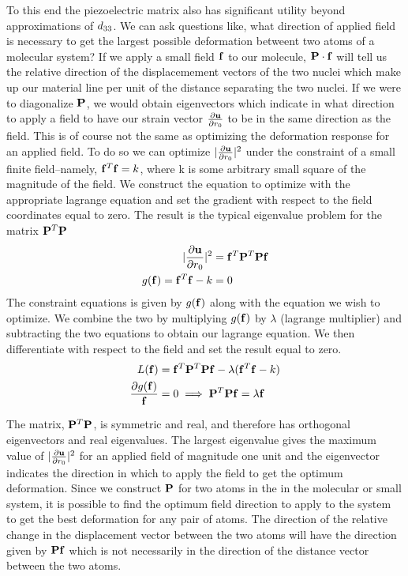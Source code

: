 To this end the piezoelectric matrix also has significant utility beyond approximations of ${d_{33}}$.  
We can ask questions like, what direction of applied field is necessary to get the largest possible deformation betweent two atoms of a molecular
system?
If we apply a small field ${\bf{f}}$ to our molecule, ${\bf{P}}\cdot {\ensuremath{\bf{f}}}$ will tell us the relative direction of the displacemement vectors of the two nuclei which make up our material line per unit of the distance separating the two nuclei.
If we were to diagonalize ${\bf{P}}$, we would obtain eigenvectors which indicate in what direction to apply a field to have our strain vector $ \frac{\partial {\bf{u}}}{\partial r_0}$ to be in the same direction as the field.  
This is of course not the same as optimizing the deformation response for an applied field.  
To do so we can optimize $\lvert\frac{\partial {\bf{u}}}{\partial r_0}\rvert^2$ under the constraint of a small finite field--namely, ${\bf{f}}^T{\bf{f}}=k$, where k is some arbitrary small square
of the magnitude of the field.
We construct the equation to optimize with the appropriate lagrange equation and set the gradient with respect to the field coordinates equal to zero.  
The result 
is the typical eigenvalue problem for the matrix ${\bf{P}}^T{\bf{P}}$
\begin{equation}
 \begin{split}
 \lvert\frac{\partial {\bf{u}}}{\partial r_0}\rvert^2&={\bf{f}}^T{\bf{P}}^T{\bf{P}}{\bf{f}} \\
 g({\bf{f}}) = {\bf{f}}^T{\bf{f}}-k&=0\\
 \end{split}
\end{equation}
 The constraint equations is given by $g({\bf{f}})$ along with the equation we wish to optimize.
 We combine the two by multiplying $g({\bf{f}})$ by $\lambda$ (lagrange multiplier) and subtracting the two equations to obtain our lagrange equation.
 We then differentiate with respect to the field and set the result equal to zero.   
\begin{equation}
 \begin{split}
  L({\bf{f}})&={\bf{f}}^T{\bf{P}}^T{\bf{P}}{\bf{f}}-\lambda({\bf{f}}^T{\bf{f}}-k)\\
  \frac{\partial g({\bf{f}})}{{\bf{f}}}&=0 \implies
  {\bf{P}}^T{\bf{P}}{\bf{f}}=\lambda {\bf{f}}
 \end{split}
\end{equation}

The matrix, ${\bf{P}}^T{\bf{P}}$, is symmetric and real, and therefore has orthogonal eigenvectors and real eigenvalues.   
The largest eigenvalue gives the maximum value of $\lvert\frac{\partial {\bf{u}}}{\partial r_0}\rvert^2$ for an applied field of 
magnitude one unit and the eigenvector indicates the direction in which to apply the field to get the optimum deformation.  
Since we construct ${\bf{P}}$ for two atoms in the in the molecular or 
small system, it is possible to find the optimum field direction to apply to the system to get the best deformation for any pair of atoms.  
The direction of the relative change in the displacement vector
between the two atoms will have the direction given by ${\bf{P}}{\bf{f}}$ 
which is not necessarily in the direction of the distance vector between the two atoms. 

